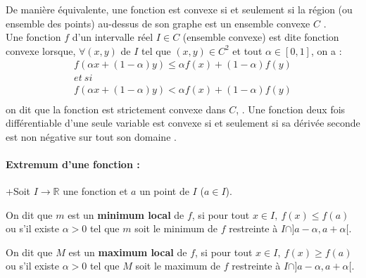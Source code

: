 		De manière équivalente, une fonction est convexe si et seulement si la région (ou ensemble des points) au-dessus de son graphe est un ensemble convexe ${C}$ \cite{coulombeau2013math}.\\
		Une fonction $f$ d'un intervalle réel $I \in {C}$ (ensemble convexe) est dite fonction convexe lorsque, $\forall (x,y)$ de $I$ tel que $(x,y) \in {C}^2$ et tout $\alpha \in [0, 1]$, \cite{jtshiman:2021}  on a :
		\begin{equation*}
			\begin{split}
				 f(\alpha x + (1 - \alpha)y) \leq \alpha f(x) + (1 - \alpha)f(y) \\ 
				  et \ si \qquad \qquad \qquad \qquad \\
				 f(\alpha x + (1 - \alpha)y) < \alpha f(x) + (1 - \alpha)f(y) \\
				 \label{eq:convexe}
			\end{split}
		\end{equation*}
		on dit que la fonction est strictement convexe dans ${C}$,  \cite{jtshiman:2021}. Une fonction deux fois différentiable d'une seule variable est convexe si et seulement si sa dérivée seconde est non négative sur tout son domaine \cite{benner2015numerical}.
		
		\paragraph*{Extremum d'une fonction \cite{coulombeau2013math}: }
		\begin{list}{+}{Soit $I \rightarrow  \mathbb{R} $ une fonction et $a$ un point de $I$ ($a \in I$).}
			\item  {On dit que $m$ est un \textbf{minimum local} de $f$, si pour tout $x \in I,\ f(x) \leq f(a)$ ou
				s'il existe $\alpha > 0$ tel que $m$ soit le minimum de $f$ restreinte à $I \cap ] a-\alpha, a + \alpha [$. }
			\item On dit que $M$ est un \textbf{maximum local} de $f$, si pour tout $x \in I,\ f(x) \geq f(a)$ ou s'il existe $\alpha > 0$ tel que $M$ soit le maximum de $f$ restreinte à $I \cap ] a-\alpha, a + \alpha [$. 
		\end{list}
		
